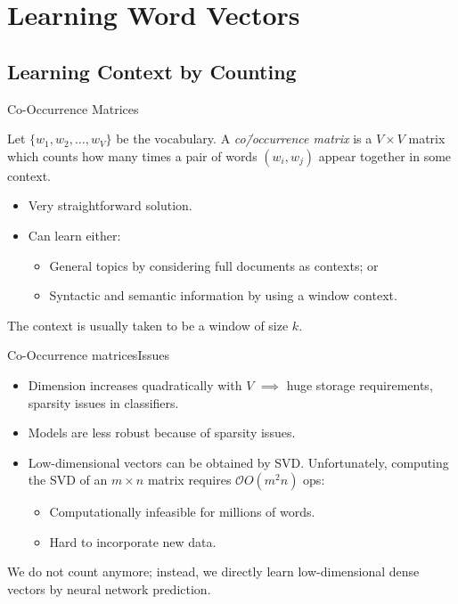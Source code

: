 \documentclass[usepdftitle=false]{beamer}
\theoremstyle{definition}
\newcommand*{\BigOh}{\mathcal{O}}%
\begin{document}
\section{Learning Word Vectors}

\subsection{Learning Context by Counting}

\begin{frame}{Co-Occurrence Matrices}
  \begin{definition}
    Let \(\{w_1, w_2, \ldots, w_V\}\) be the vocabulary.  A
    \emph{co\=/occurrence matrix} is a \(V \times V\) matrix which
    counts how many times a pair of words \((w_i, w_j)\) appear
    together in some context.
  \end{definition}
  \begin{itemize}
  \item Very straightforward solution.
  \item Can learn either:
    \begin{itemize}
    \item General topics by considering full documents as contexts; or
    \item Syntactic and semantic information by using a window
      context.
    \end{itemize}
  \end{itemize}
  The context is usually taken to be a window of size \(k\).
\end{frame}

\begin{frame}{Co-Occurrence matrices}{Issues}
  \begin{itemize}
  \item Dimension increases quadratically with \(V\) \(\implies\) huge
    storage requirements, sparsity issues in classifiers.
  \item Models are less robust because of sparsity issues.
  \item Low-dimensional vectors can be obtained by SVD\@.
    Unfortunately, computing the SVD of an \(m \times n\) matrix
    requires \(\BigOh{O}(m^2 n)\) ops:
    \begin{itemize}
    \item Computationally infeasible for millions of words.
    \item Hard to incorporate new data.
    \end{itemize}
  \end{itemize}
    We do not count anymore;
  instead, we directly learn low-dimensional dense vectors by neural
  network prediction.
\end{frame}
\end{document}
